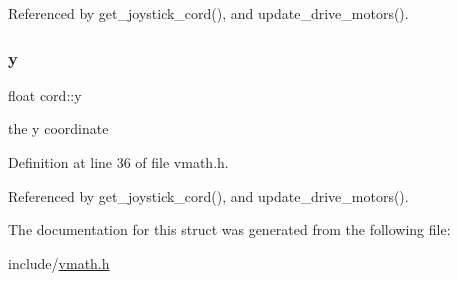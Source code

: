 Referenced by get\+\_\+joystick\+\_\+cord(), and update\+\_\+drive\+\_\+motors().

\mbox{\label{structcord_a4e7d289c55cfe511532e53a81dc19215}} 
\subsubsection{\texorpdfstring{y}{y}}
{\footnotesize\ttfamily float cord\+::y}

the y coordinate 

Definition at line 36 of file vmath.\+h.



Referenced by get\+\_\+joystick\+\_\+cord(), and update\+\_\+drive\+\_\+motors().



The documentation for this struct was generated from the following file\+:\begin{DoxyCompactItemize}
\item 
include/\hyperlink{vmath_8h}{vmath.\+h}\end{DoxyCompactItemize}
